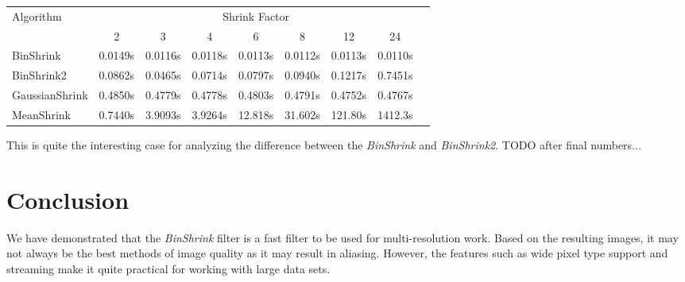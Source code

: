 \documentclass{InsightArticle}
\begin{document}
\begin{table}
\begin{center}
\begin{tabular}{l|*{7}{c}r}
Algorithm & \multicolumn{7}{c}{Shrink Factor} \\
  &            2 & 3 & 4 & 6 & 8 & 12 & 24 \\
\hline
BinShrink &     0.0149s & 0.0116s & 0.0118s & 0.0113s & 0.0112s & 0.0113s & 0.0110s\\
BinShrink2 &    0.0862s & 0.0465s & 0.0714s & 0.0797s & 0.0940s & 0.1217s & 0.7451s\\
GaussianShrink &0.4850s & 0.4779s & 0.4778s & 0.4803s & 0.4791s & 0.4752s & 0.4767s\\
MeanShrink &    0.7440s & 3.9093s & 3.9264s & 12.818s & 31.602s & 121.80s & 1412.3s\\
\end{tabular}
\label{tab:ShrinkPerformance}
\end{center}
\end{table}

This is quite the interesting case for analyzing the difference
between the \textit{BinShrink} and \textit{BinShrink2}. TODO after
final numbers...

\section{Conclusion}

We have demonstrated that the \textit{BinShrink} filter is a fast
filter to be used for multi-resolution work. Based on the resulting
images, it may not always be the best methods of image quality as it
may result in aliasing. However, the features such as wide pixel type
support and streaming make it quite practical for working with large
data sets.




\end{document}
